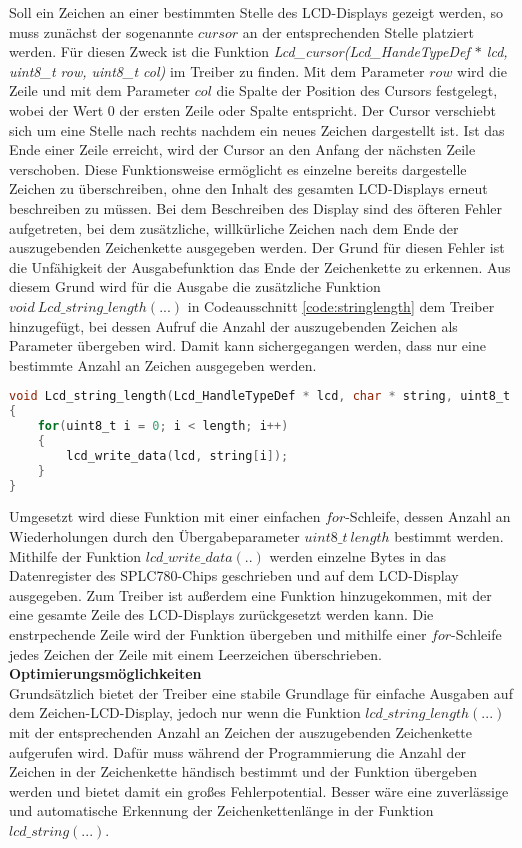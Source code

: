 Soll ein Zeichen an einer bestimmten Stelle des LCD-Displays gezeigt werden, so muss zunächst der sogenannte $cursor$ an der entsprechenden Stelle platziert werden. Für diesen Zweck ist die Funktion \textit{Lcd\_cursor(Lcd\_HandeTypeDef $*$ lcd, uint8\_t row, uint8\_t col)} im Treiber zu finden. Mit dem Parameter $row$ wird die Zeile und mit dem Parameter $col$ die Spalte der Position des Cursors festgelegt, wobei der Wert 0 der ersten Zeile oder Spalte entspricht. Der Cursor verschiebt sich um eine Stelle nach rechts nachdem ein neues Zeichen dargestellt ist. Ist das Ende einer Zeile erreicht, wird der Cursor an den Anfang der nächsten Zeile verschoben. Diese Funktionsweise ermöglicht es einzelne bereits dargestelle Zeichen zu überschreiben, ohne den Inhalt des gesamten LCD-Displays erneut beschreiben zu müssen.
\newline
Bei dem Beschreiben des Display sind des öfteren Fehler aufgetreten, bei dem zusätzliche, willkürliche Zeichen nach dem Ende der auszugebenden Zeichenkette ausgegeben werden. Der Grund für diesen Fehler ist die Unfähigkeit der Ausgabefunktion das Ende der Zeichenkette zu erkennen. Aus diesem Grund wird für die Ausgabe die zusätzliche Funktion $void\ Lcd\_string\_length(...)$ in Codeausschnitt \ref{code:stringlength} dem Treiber hinzugefügt, bei dessen Aufruf die Anzahl der auszugebenden Zeichen als Parameter übergeben wird. Damit kann sichergegangen werden, dass nur eine bestimmte Anzahl an Zeichen ausgegeben werden.
\begin{lstlisting}[firstnumber=95, language=C, caption = lcd.c: Funktion Lcd\_string\_length(...), label = code:stringlength]
void Lcd_string_length(Lcd_HandleTypeDef * lcd, char * string, uint8_t length)
{
	for(uint8_t i = 0; i < length; i++)
	{
		lcd_write_data(lcd, string[i]);
	}
}
\end{lstlisting}
Umgesetzt wird diese Funktion mit einer einfachen $for$-Schleife, dessen Anzahl an Wiederholungen durch den Übergabeparameter $uint8\_t\ length$ bestimmt werden. Mithilfe der Funktion $lcd\_write\_data(..)$ werden einzelne Bytes in das Datenregister des SPLC780-Chips geschrieben und auf dem LCD-Display ausgegeben.
Zum Treiber ist außerdem eine Funktion hinzugekommen, mit der eine gesamte Zeile des LCD-Displays zurückgesetzt werden kann. Die enstrpechende Zeile wird der Funktion übergeben und mithilfe einer $for$-Schleife jedes Zeichen der Zeile mit einem Leerzeichen überschrieben.\\
\newline
\textbf{Optimierungsmöglichkeiten}\\
Grundsätzlich bietet der Treiber eine stabile Grundlage für einfache Ausgaben auf dem Zeichen-LCD-Display, jedoch nur wenn die Funktion $lcd\_string\_length(...)$ mit der entsprechenden Anzahl an Zeichen der auszugebenden Zeichenkette aufgerufen wird. Dafür muss während der Programmierung die Anzahl der Zeichen in der Zeichenkette händisch bestimmt und der Funktion übergeben werden und bietet damit ein großes Fehlerpotential. Besser wäre eine zuverlässige und automatische Erkennung der Zeichenkettenlänge in der Funktion $lcd\_string(...)$.